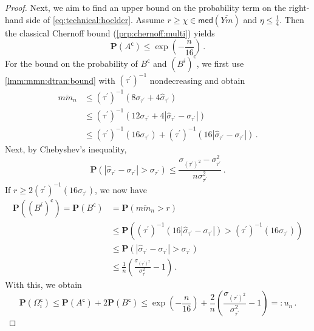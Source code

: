 \documentclass{article}
\newcommand{\lb}{\left(} %
\newcommand{\rb}{\right)} %
\newcommand{\br}[1]{\lb #1 \rb} %
\newcommand{\brOf}[1]{\!\br{#1}} %
\newcommand{\absOf}[1]{\left\vert #1 \right\vert} %
\renewcommand{\Pr}{\mathbf{P}} %
\newcommand{\PrOf}[1]{\Pr\brOf{#1}}
\newcommand{\pr}{^\prime}
\newcommand{\compl}{^\mathsf{c}}%
\newcommand{\eqfs}{\,.}
\newcommand{\ol}[2]{\overline{#1#2}}
\newcommand{\dtran}{\tau\pr}
\newcommand{\invdtran}{(\tau\pr)^{-1}}
\newcommand{\median}{\mathsf{med}}
\begin{document}
\begin{proof}
    Next, we aim to find an upper bound on the probability term on the right-hand side of \eqref{eq:technical:hoelder}.
    Assume $r \geq \chi \in  \median(\ol Ym)$ and $\eta \leq \frac14$. Then the classical Chernoff bound (\cref{prp:chernoff:multi}) yields
    \begin{equation}
        \PrOf{A\compl} \leq \exp\brOf{-\frac{n}{16}}
        \eqfs
    \end{equation}
    For the bound on the probability of $B\compl$ and $(B^i)\compl$, we first use \cref{lmm:mmn:dtran:bound} with $\invdtran$ nondecreasing and obtain
    \begin{align}
        \ol m{m_n}
        &\leq
        \invdtran\brOf{8 \sigma_{\dtran} + 4 \hat \sigma_{\dtran}} 
        \\&\leq
        \invdtran\brOf{12 \sigma_{\dtran} + 4 \absOf{ \hat \sigma_{\dtran}- \sigma_{\dtran} }} 
        \\&\leq
        \invdtran\brOf{16 \sigma_{\dtran}} + \invdtran\brOf{16 \absOf{ \hat \sigma_{\dtran}- \sigma_{\dtran} }} 
        \eqfs
    \end{align}
    Next, by Chebyshev's inequality,
    \begin{equation}
        \PrOf{\absOf{\hat \sigma_{\dtran}- \sigma_{\dtran} } > \sigma_{\dtran}} \leq \frac{\sigma_{(\dtran)^2} - \sigma_{\dtran}^2}{n \sigma_{\dtran}^2}
        \eqfs
    \end{equation}
    If $r\geq 2 \invdtran\brOf{16 \sigma_{\dtran}}$, we now have
    \begin{align}
        \PrOf{(B^i)\compl} 
        =
        \PrOf{B\compl}
        &= 
        \PrOf{\ol m{m_n} > r} 
        \\&\leq 
        \PrOf{\invdtran\brOf{16 \absOf{ \hat \sigma_{\dtran}- \sigma_{\dtran}}} > \invdtran\brOf{16 \sigma_{\dtran}}}
        \\&\leq 
        \PrOf{\absOf{ \hat \sigma_{\dtran}- \sigma_{\dtran}} > \sigma_{\dtran}}
        \\&\leq
        \frac1n \br{\frac{\sigma_{(\dtran)^2}}{\sigma_{\dtran}^2} -1}
        \eqfs
    \end{align}
    With this, we obtain
    \begin{equation}
        \PrOf{\Omega_i\compl}
        \leq 
        \PrOf{A\compl} + 2\PrOf{B\compl}
        \leq 
        \exp\brOf{-\frac{n}{16}} +  \frac2n \br{\frac{\sigma_{(\dtran)^2}}{\sigma_{\dtran}^2}-1}
        =:
        u_n
        \eqfs
    \end{equation}
    

\end{proof}
\end{document}
